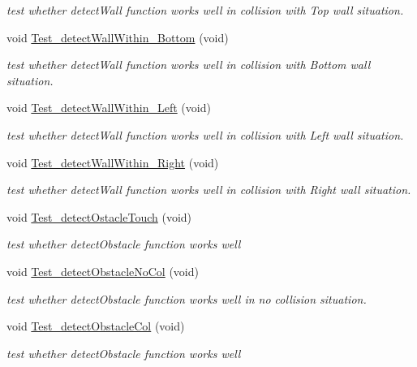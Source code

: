 \begin{DoxyCompactItemize}
\begin{DoxyCompactList}\small\item\em test whether detect\-Wall function works well in collision with Top wall situation. \end{DoxyCompactList}\item 
void \hyperlink{classObjectTests_afa6b29b259842f8549c69c1adea09a6c}{Test\-\_\-detect\-Wall\-Within\-\_\-\-Bottom} (void)
\begin{DoxyCompactList}\small\item\em test whether detect\-Wall function works well in collision with Bottom wall situation. \end{DoxyCompactList}\item 
void \hyperlink{classObjectTests_a45b83d0a628d43eca08e3b5babe978e7}{Test\-\_\-detect\-Wall\-Within\-\_\-\-Left} (void)
\begin{DoxyCompactList}\small\item\em test whether detect\-Wall function works well in collision with Left wall situation. \end{DoxyCompactList}\item 
void \hyperlink{classObjectTests_a2547f1471a274e1e48d553274d26148c}{Test\-\_\-detect\-Wall\-Within\-\_\-\-Right} (void)
\begin{DoxyCompactList}\small\item\em test whether detect\-Wall function works well in collision with Right wall situation. \end{DoxyCompactList}\item 
void \hyperlink{classObjectTests_a6fd794a9bc7550576305b528de2945ff}{Test\-\_\-detect\-Ostacle\-Touch} (void)
\begin{DoxyCompactList}\small\item\em test whether detect\-Obstacle function works well \end{DoxyCompactList}\item 
void \hyperlink{classObjectTests_a8edeba160a6edf0668132146d63de4ba}{Test\-\_\-detect\-Obstacle\-No\-Col} (void)
\begin{DoxyCompactList}\small\item\em test whether detect\-Obstacle function works well in no collision situation. \end{DoxyCompactList}\item 
void \hyperlink{classObjectTests_a1493e5b4f9715b52c6e40de7955b59ba}{Test\-\_\-detect\-Obstacle\-Col} (void)
\begin{DoxyCompactList}\small\item\em test whether detect\-Obstacle function works well \end{DoxyCompactList}\end{DoxyCompactItemize}


